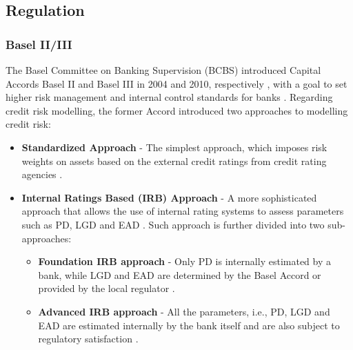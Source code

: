 \subsection{Regulation}
\subsubsection{Basel II/III}
The Basel Committee on Banking Supervision (BCBS) introduced Capital Accords Basel II and Basel III in 2004 and 2010, respectively \citep{shakdwipee2017basel}, with a goal to set higher risk management and internal control standards for banks \citep{witzany2017credit}.
Regarding credit risk modelling, the former Accord introduced two approaches to modelling credit risk:
\begin{itemize}\setlength\itemsep{0em}
     \item \textbf{Standardized Approach} - The simplest approach, which imposes risk weights on assets based on the external credit ratings from credit rating agencies \citep{konno2016alternative}.
     \item \textbf{Internal Ratings Based (IRB) Approach} - A more sophisticated approach that allows the use of internal rating systems to assess parameters such as PD, LGD and EAD \citep{baesens2016credit}. Such approach is further divided into two sub-approaches:
      \begin{itemize}\setlength\itemsep{0em}
         \item \textbf{Foundation IRB approach} - Only PD is internally estimated by a bank, while LGD and EAD are determined by the Basel Accord or provided by the local regulator \citep{baesens2016credit}.
         \item \textbf{Advanced IRB approach} - All the parameters, i.e., PD, LGD and EAD are estimated internally by the bank itself and are also subject to regulatory satisfaction \citep{joseph2013advanced}.
    \end{itemize}
\end{itemize}
